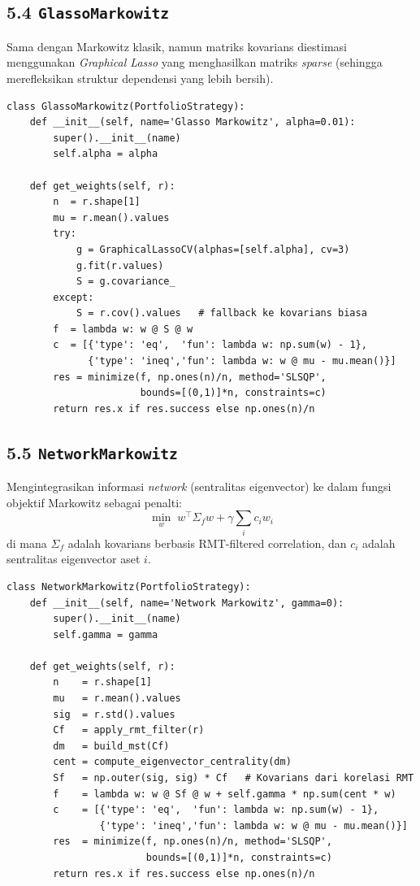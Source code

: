 \documentclass[12pt,a4paper]{article}
\begin{document}
\subsection{5.4 \texttt{GlassoMarkowitz}}
Sama dengan Markowitz klasik, namun matriks kovarians diestimasi menggunakan
\textit{Graphical Lasso} yang menghasilkan matriks \textit{sparse} (sehingga
merefleksikan struktur dependensi yang lebih bersih).

\begin{lstlisting}[caption={GlassoMarkowitz}]
class GlassoMarkowitz(PortfolioStrategy):
    def __init__(self, name='Glasso Markowitz', alpha=0.01):
        super().__init__(name)
        self.alpha = alpha

    def get_weights(self, r):
        n  = r.shape[1]
        mu = r.mean().values
        try:
            g = GraphicalLassoCV(alphas=[self.alpha], cv=3)
            g.fit(r.values)
            S = g.covariance_
        except:
            S = r.cov().values   # fallback ke kovarians biasa
        f  = lambda w: w @ S @ w
        c  = [{'type': 'eq',  'fun': lambda w: np.sum(w) - 1},
              {'type': 'ineq','fun': lambda w: w @ mu - mu.mean()}]
        res = minimize(f, np.ones(n)/n, method='SLSQP',
                       bounds=[(0,1)]*n, constraints=c)
        return res.x if res.success else np.ones(n)/n
\end{lstlisting}

\subsection{5.5 \texttt{NetworkMarkowitz}}
Mengintegrasikan informasi \textit{network} (sentralitas eigenvector) ke dalam
fungsi objektif Markowitz sebagai penalti:
\[
\min_w \; w^\top \Sigma_f w + \gamma \sum_i c_i w_i
\]
di mana $\Sigma_f$ adalah kovarians berbasis RMT-filtered correlation,
dan $c_i$ adalah sentralitas eigenvector aset $i$.

\begin{lstlisting}[caption={NetworkMarkowitz}]
class NetworkMarkowitz(PortfolioStrategy):
    def __init__(self, name='Network Markowitz', gamma=0):
        super().__init__(name)
        self.gamma = gamma

    def get_weights(self, r):
        n    = r.shape[1]
        mu   = r.mean().values
        sig  = r.std().values
        Cf   = apply_rmt_filter(r)
        dm   = build_mst(Cf)
        cent = compute_eigenvector_centrality(dm)
        Sf   = np.outer(sig, sig) * Cf   # Kovarians dari korelasi RMT
        f    = lambda w: w @ Sf @ w + self.gamma * np.sum(cent * w)
        c    = [{'type': 'eq',  'fun': lambda w: np.sum(w) - 1},
                {'type': 'ineq','fun': lambda w: w @ mu - mu.mean()}]
        res  = minimize(f, np.ones(n)/n, method='SLSQP',
                        bounds=[(0,1)]*n, constraints=c)
        return res.x if res.success else np.ones(n)/n
\end{lstlisting}
\end{document}
